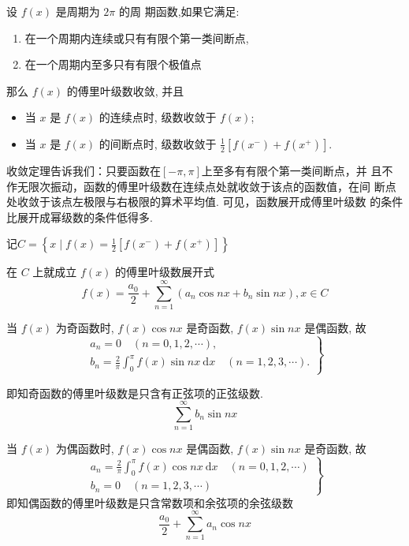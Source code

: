 \begin{theorem}
    设 $ f(x) $ 是周期为 $ 2 \pi $ 的周 期函数,如果它满足:

    \begin{enumerate}
        \item 在一个周期内连续或只有有限个第一类间断点,
        \item 在一个周期内至多只有有限个极值点
    \end{enumerate}

    那么 $ f(x) $ 的傅里叶级数收敛, 并且

    \begin{itemize}
    \item 当 $ x $ 是 $ f(x) $ 的连续点时, 级数收敛于 $ f(x) $;
    \item 当 $ x $ 是 $ f(x) $ 的间断点时, 级数收敛于 $ \frac{1}{2}\left[f\left(x^{-}\right)+f\left(x^{+}\right)\right] $.
    \end{itemize}
\end{theorem}

收敛定理告诉我们：只要函数在$[-\pi,\pi]$上至多有有限个第一类间断点，并
且不作无限次振动，函数的傅里叶级数在连续点处就收敛于该点的函数值，在间
断点处收敛于该点左极限与右极限的算术平均值. 可见，函数展开成傅里叶级数
的条件比展开成幂级数的条件低得多. 

\begin{corollary}
    记$
C=\left\{x \mid f(x)=\frac{1}{2}\left[f\left(x^{-}\right)+f\left(x^{+}\right)\right]\right\}
$

在 $ C $ 上就成立 $ f(x) $ 的傅里叶级数展开式
$$
f(x)=\frac{a_{0}}{2}+\sum_{n=1}^{\infty}\left(a_{n} \cos n x+b_{n} \sin n x\right), x \in C
$$
\end{corollary}

\begin{definition}[正弦级数]
    当 $ f(x) $ 为奇函数时, $ f(x) \cos n x $ 是奇函数, $ f(x) \sin n x $ 是偶函数, 故
$$
\left.\begin{array}{l}
a_{n}=0 \quad(n=0,1,2, \cdots), \\
b_{n}=\frac{2}{\pi} \int_{0}^{\pi} f(x) \sin n x \mathrm{~d} x \quad(n=1,2,3, \cdots) .
\end{array}\right\}
$$

即知奇函数的傅里叶级数是只含有正弦项的正弦级数.
$$ \sum_{n=1}^{\infty} b_{n} \sin n x $$
\end{definition}

\begin{definition}[余弦级数]
    当 $ f(x) $ 为偶函数时, $ f(x) \cos n x $ 是偶函数, $ f(x) \sin n x $ 是奇函数, 故
$$
\left.\begin{array}{l}
a_{n}=\frac{2}{\pi} \int_{0}^{\pi} f(x) \cos n x \mathrm{~d} x \quad(n=0,1,2, \cdots) \\
b_{n}=0 \quad(n=1,2,3, \cdots)
\end{array}\right\}
$$
即知偶函数的傅里叶级数是只含常数项和余弦项的余弦级数
$$
\frac{a_{0}}{2}+\sum_{n=1}^{\infty} a_{n} \cos n x
$$
\end{definition}

